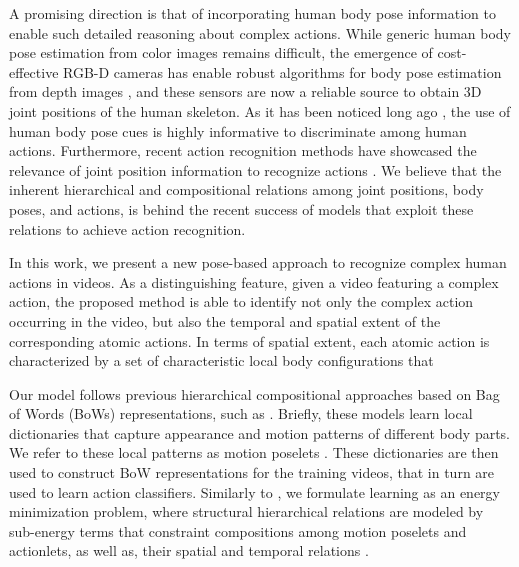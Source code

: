 A promising direction is that of incorporating human body pose information
to enable such detailed reasoning about complex actions.
While generic human body pose estimation from color images remains difficult,
the emergence of cost-effective RGB-D cameras has enable robust
algorithms for body pose estimation from depth images
\cite{Shotton:EtAl:11}, and these sensors are now
a reliable source to obtain 3D joint positions of the human skeleton. 
As it has been noticed long ago \cite{Johansson:1973}, the use of human body
pose cues is highly informative to discriminate among human actions.
Furthermore, recent action recognition methods have
showcased the relevance of joint position information to 
recognize actions \cite{Jhuang2013,Wang2013}. We believe that the 
inherent
hierarchical and compositional relations among joint positions, body poses, and 
actions, is behind the recent success of models that exploit these 
relations to achieve action recognition.

In this work, we present a new pose-based approach to recognize
complex human actions in videos. As a distinguishing feature,
given a video featuring a complex action, the
proposed method is able to identify not only the complex action occurring in the
video, but also the temporal and spatial extent of the corresponding atomic
actions. In terms of spatial extent, each atomic action is characterized by a 
set of characteristic local body configurations that 


Our model follows previous hierarchical compositional approaches based on Bag
of Words (BoWs) representations, such as \cite{Wang2013, 
Lillo2014,Taralova:EtAl:2014,Tao2015}.
Briefly, these models learn local dictionaries that capture
appearance and motion patterns of different body parts. We refer to these local 
patterns as motion poselets \cite{Bourdev:EtAl:2010, Tao2015}. These
dictionaries are then used to construct BoW representations for the training
videos, that in turn are used to learn action classifiers. Similarly to
\cite{Lillo2014, Tao2015}, we formulate learning as an energy minimization
problem, where structural hierarchical relations are modeled by sub-energy
terms that constraint compositions among
motion poselets and actionlets, as well as, their spatial and 
temporal relations
\cite{Lillo2014}.


